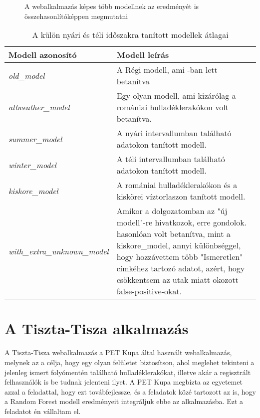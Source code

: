 \begin{figure}[H]
	\centering
	\hspace{5pt}
	\caption{A webalkalmazás képes több modellnek az eredményét is összehasonlítóképpen megmutatni}
	\label{fig:waste-detection-demo}
\end{figure}

\begin{table}[H]
	\centering
	\begin{tabular}{ | p{} | p{} | }
		\hline
		\textbf{Modell azonosító} & \textbf{Modell leírás} \\
		\hline \hline
		\emph{old\_model} & A Régi modell, ami \cite{magyar2023}-ban lett betanítva \\
		\hline
		\emph{allweather\_model} & Egy olyan modell, ami kizárólag a romániai hulladéklerakókon volt betanítva. \\
		\hline
		\emph{summer\_model} & A nyári intervallumban található adatokon tanított modell.  \\
		\hline
        \emph{winter\_model} & A téli intervallumban található adatokon tanított modell. \\
        \hline
        \emph{kiskore\_model} & A romániai hulladéklerakókon és a kiskörei víztorlaszon tanított modell. \\
		\hline
        \emph{with\_extra\_unknown\_model} & Amikor a dolgozatomban az "új modell"-re hivatkozok, erre gondolok. hasonlóan volt betanítva, mint a kiskore\_model, annyi különbséggel, hogy hozzávettem több "Ismeretlen" címkéhez tartozó adatot, azért, hogy csökkentsem az utak miatt okozott false-positive-okat. \\
		\hline
	\end{tabular}
	\caption{A külön nyári és téli időszakra tanított modellek átlagai}
	\label{tab:model-ids}
\end{table}

\section{A Tiszta-Tisza alkalmazás}

A Tiszta-Tisza webalkalmazás  a PET Kupa által használt webalkalmazás, melynek az a célja, hogy egy olyan felületet biztosítson, ahol meglehet tekinteni a jelenleg ismert folyómentén található hulladéklerakókat, illetve akár a regisztrált felhasználók is be tudnak jelenteni ilyet. A PET Kupa megbízta az egyetemet azzal a feladattal, hogy ezt továbfejlessze, és a feladatok közé tartozott az is, hogy a Random Forest modell eredményeit integráljuk ebbe az alkalmazásba. Ezt a feladatot én vállaltam el.

